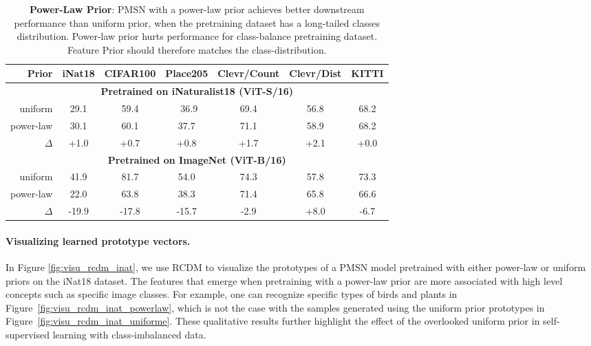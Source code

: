\documentclass{article} %
\newcommand{\quentin}[1]{{\color{purple}#1}}
\begin{document}
\begin{table}[t]
    \centering
    \footnotesize
    \caption{\textbf{Power-Law Prior}: PMSN with a power-law prior achieves better downstream performance than uniform prior, when the pretraining dataset has a long-tailed classes distribution. Power-law prior hurts performance for class-balance pretraining dataset. Feature Prior should therefore matches the class-distribution.}
    \label{tb:inat_powerlaw_priors}
    \begin{tabular}{r|cccc|cc}
        \toprule
        Prior & iNat18 & CIFAR100 & Place205 & Clevr/Count & Clevr/Dist & KITTI\\
        \toprule\toprule
        \multicolumn{7}{c}{\scriptsize\bf Pretrained on iNaturalist18 (ViT-S/16)}\\[1mm]
        uniform & 29.1 & 59.4 & \ 36.9 & 69.4 & 56.8 & 68.2 \\
        power-law & 30.1 & 60.1 & 37.7 & 71.1 & 58.9 & 68.2 \\
        $\Delta$ & \color{blue} +1.0 & \color{blue} +0.7 & \color{blue}+0.8 & \color{blue}+1.7 & \color{blue}+2.1 & +0.0 \\
        \midrule
        \multicolumn{7}{c}{\scriptsize\bf Pretrained on ImageNet (ViT-B/16)}\\[1mm]
        uniform & 41.9 & 81.7 & 54.0 & 74.3 & 57.8 & 73.3 \\
        power-law & 22.0 & 63.8 & 38.3 & 71.4 & 65.8 & 66.6 \\
        $\Delta$ & \color{red}-19.9 & \color{red}-17.8 & \color{red}-15.7 & \color{red}-2.9 & \color{blue}+8.0 & \color{red}-6.7\\
        \bottomrule
    \end{tabular}
\end{table}


\paragraph{Visualizing learned prototype vectors.}
In Figure \ref{fig:visu_rcdm_inat}, we use RCDM to visualize the prototypes of a PMSN model pretrained with either power-law or uniform priors on the iNat18 dataset.
The features that emerge when pretraining with a power-law prior are more associated with high level concepts such as specific image classes.
For example, one can recognize specific types of birds and plants in Figure~\ref{fig:visu_rcdm_inat_powerlaw}, which is not the case with the samples generated using the uniform prior prototypes in Figure~\ref{fig:visu_rcdm_inat_uniforme}.
These qualitative results further highlight the effect of the overlooked uniform prior in self-supervised learning with class-imbalanced data.
\end{document}
